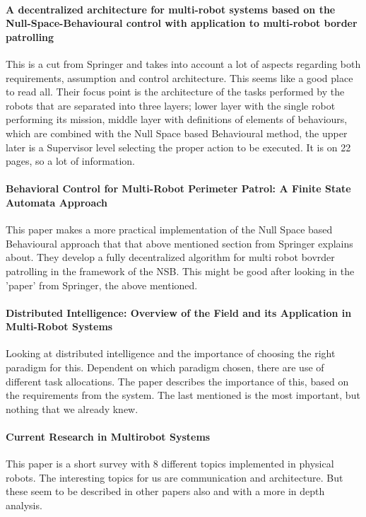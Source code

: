 \paragraph{A decentralized architecture for multi-robot systems based on the Null-Space-Behavioural control with application to multi-robot border patrolling}
This is a cut from Springer and takes into account a lot of aspects regarding both requirements, assumption and control architecture. This seems like a good place to read all. Their focus point is the architecture of the tasks performed by the robots that are separated into three layers; lower layer with the single robot performing its mission, middle layer with definitions of elements of behaviours, which are combined with the Null Space based Behavioural method, the upper later is a Supervisor level selecting the proper action to be executed. It is on 22 pages, so a lot of information.

\paragraph{Behavioral Control for Multi-Robot Perimeter Patrol: A Finite State Automata Approach}
This paper makes a more practical implementation of the Null Space based Behavioural approach that that above mentioned section from Springer explains about. They develop a fully decentralized algorithm for multi robot bovrder patrolling in the framework of the NSB.
This might be good after looking in the 'paper' from Springer, the above mentioned.

{\vskip0pt\color{gray}
\paragraph{Distributed Intelligence: Overview of the Field and its Application in Multi-Robot Systems}
Looking at distributed intelligence and the importance of choosing the right paradigm for this. Dependent on which paradigm chosen, there are use of different task allocations. The paper describes the importance of this, based on the requirements from the system.
The last mentioned is the most important, but nothing that we already knew.}

\paragraph{Current Research in Multirobot Systems}
This paper is a short survey with 8 different topics implemented in physical robots. The interesting topics for us are communication and architecture.
But these seem to be described in other papers also and with a more in depth analysis.

